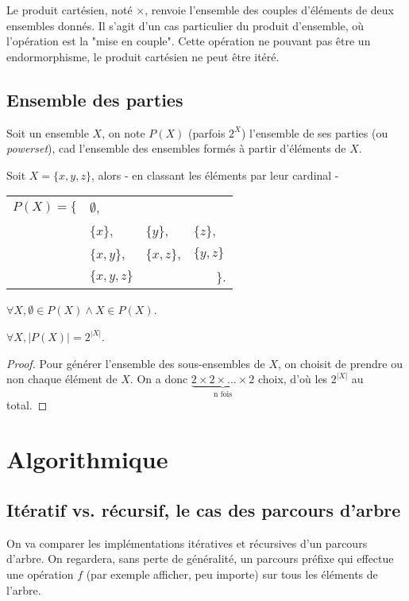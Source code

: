 Le produit cartésien, noté $\times$, renvoie l'ensemble des couples d'éléments de deux ensembles donnés. Il s'agit d'un cas particulier du produit d'ensemble, où l'opération est la "mise en couple". Cette opération ne pouvant pas être un endormorphisme, le produit cartésien ne peut être itéré.

\subsection{Ensemble des parties}
\label{powerset}
Soit un ensemble $X$, on note $P(X)$ (parfois $2^X$) l'ensemble de ses parties (ou \textit{powerset}), cad l'ensemble des ensembles formés à partir d'éléments de $X$. 

\begin{example}
Soit $X = \{x,y,z\}$, alors - en classant les éléments par leur cardinal -

\begin{tabular}{llll}
 $P(X) = \{$ & $\emptyset$, & & \\
& $\{x\}$,&$\{y\}$,&$\{z\}$,\\
&$\{x,y\}$,& $\{x,z\}$,&$\{y,z\}$\\
& $\{x,y,z\}$ & &$~~~~~~~~\}$.
\end{tabular}
\end{example}

\begin{lemma}
$\forall X, \emptyset \in P(X) \wedge X \in P(X)$.
\end{lemma}

\begin{lemma}
\label{cardpowerset}
$\forall X, |P(X)| = 2^{|X|}$.
\end{lemma}

\begin{proof}
Pour générer l'ensemble des sous-ensembles de $X$, on choisit de prendre ou non chaque élément de $X$. On a donc $\underbrace{2 \times 2 \times ... \times 2}_{\textrm{n fois}}$ choix, d'où les $2^{|X|}$ au total.
\end{proof}



\section{Algorithmique}

\subsection{Itératif vs. récursif, le cas des parcours d'arbre}
\label{itersif}
On va comparer les implémentations itératives et récursives d'un parcours d'arbre. On regardera, sans perte de généralité, un parcours préfixe qui effectue une opération $f$ (par exemple afficher, peu importe) sur tous les éléments de l'arbre.

